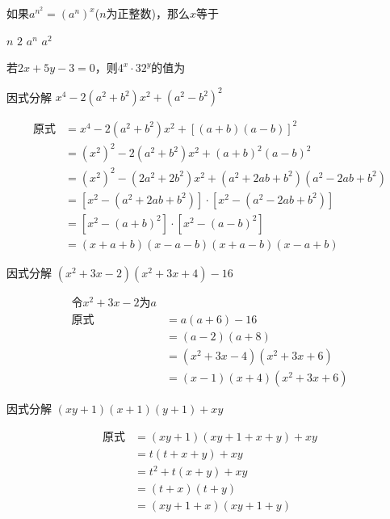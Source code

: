 \documentclass[answers]{exam} %
\begin{document}
\begin{questions}

\question
  如果$a^{n^2}=(a^n)^x$($n$为正整数)，那么$x$等于
  
  \begin{choices}
  \correctchoice $n$
  \choice $2$
  \choice $a^n$
  \choice $a^2$
  \end{choices}

\question
  若$2x+5y-3=0$，则$4^x \cdot 32^y$的值为\fillin[8]

\question
  因式分解 $x^4-2(a^2+b^2)x^2+(a^2-b^2)^2$

  \vspace*{1in}
  \begin{solution}
    \[
      \begin{aligned}
        \mbox{原式} &= x^4-2(a^2+b^2)x^2+[(a+b)(a-b)]^2 \\
        &= (x^2)^2 - 2(a^2+b^2)x^2+(a+b)^2(a-b)^2 \\
        &= (x^2)^2-(2a^2+2b^2)x^2+(a^2+2ab+b^2)(a^2-2ab+b^2) \\
        &= [x^2-(a^2+2ab+b^2)] \cdot [x^2-(a^2-2ab+b^2)] \\
        &= [x^2-(a+b)^2] \cdot [x^2-(a-b)^2] \\
        &= (x+a+b)(x-a-b)(x+a-b)(x-a+b)
      \end{aligned}
    \]
  \end{solution}

\question
  因式分解 $(x^2+3x-2)(x^2+3x+4)-16$

  \vspace*{1in}
  \begin{solution}
\[
  \begin{aligned}
    \mbox{令} x^2+3x-2\mbox{为}a \\
    \mbox{原式} &= a(a+6)-16 \\
    &= (a-2)(a+8) \\
    &= (x^2+3x-4)(x^2+3x+6) \\
    &= (x - 1)(x + 4)(x^2 + 3x + 6)
  \end{aligned}
\]
\end{solution}

\question
  因式分解 $(xy+1)(x+1)(y+1)+xy$

  \vspace*{1in}
  \begin{solution}
\[
\begin{aligned}
  \mbox{原式} &= (xy+1)(xy+1+x+y)+xy \\
  &= t(t+x+y)+xy \\
  &= t^2+t(x+y)+xy \\
  &= (t+x)(t+y) \\
  &= (xy + 1 + x)(xy + 1 + y)
\end{aligned}
\]
\end{solution}


\end{questions}
\end{document}
